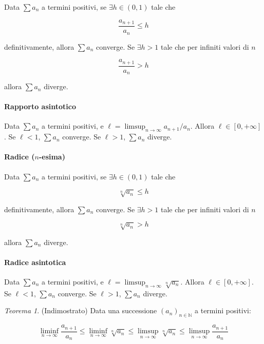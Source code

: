 \documentclass[12pt,a4paper]{report}
\numberwithin{equation}{section}
\theoremstyle{definition}
\theoremstyle{remark}
\newtheorem{theorem}{Teorema}[section]
\begin{document}
Data $\sum a_n$ a termini positivi, se $\exists h \in (0, 1)$ tale che 

\begin{equation}
\frac{a_{n+1}}{a_n} \leq h
\end{equation}

definitivamente, allora $\sum a_n$ converge. Se $\exists h > 1$ tale che per infiniti valori di $n$

\begin{equation}
\frac{a_{n+1}}{a_n} > h
\end{equation}

allora $\sum a_n$ diverge.

\paragraph{Rapporto asintotico}

Data $\sum a_n$ a termini positivi, e $\ell = \limsup_{n \rightarrow \infty} a_{n+1}/a_n.$ Allora $\ell \in [0, +\infty]$. Se $\ell < 1$, $\sum a_n$ converge. Se $\ell > 1$, $\sum a_n$ diverge.

\paragraph{Radice ($n$-esima)}

Data $\sum a_n$ a termini positivi, se $\exists h \in (0, 1)$ tale che 

\begin{equation}
\sqrt[n]{a_n} \leq h
\end{equation}

definitivamente, allora $\sum a_n$ converge. Se $\exists h > 1$ tale che per infiniti valori di $n$

\begin{equation}
\sqrt[n]{a_n} > h
\end{equation}

allora $\sum a_n$ diverge.

\paragraph{Radice asintotica}

Data $\sum a_n$ a termini positivi, e $\ell = \limsup_{n \rightarrow \infty} \sqrt[n]{a_n}.$ Allora $\ell \in [0, +\infty]$. Se $\ell < 1$, $\sum a_n$ converge. Se $\ell > 1$, $\sum a_n$ diverge.

\begin{theorem}
(Indimostrato) Data una successione $(a_n)_{n \in \mathbb{N}}$ a termini positivi:

\begin{equation}
\liminf_{n \rightarrow \infty} \frac{a_{n+1}}{a_n} \leq \liminf_{n \rightarrow \infty} \sqrt[n]{a_n}
\leq \limsup_{n \rightarrow \infty} \sqrt[n]{a_n} \leq \limsup_{n \rightarrow \infty} \frac{a_{n+1}}{a_n}
\end{equation}
\end{theorem}
\end{document}
